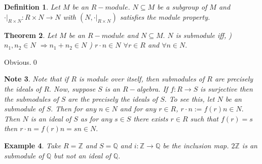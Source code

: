 \documentclass[11pt]{amsart}
\newtheorem{theorem}{Theorem}[section]
\newtheorem{definition}[theorem]{Definition}%
\newtheorem{eg}[theorem]{Example}
\newtheorem{note}[theorem]{Note}
\newcommand{\QQ}{\mathbb Q}
\newcommand{\ZZ}{\mathbb Z}
\begin{document}
\begin{definition}
Let $M$ be an $R-module.$ $N\subseteq M$ be a subgroup of $M$ and $\cdot |_{R\times N}:R\times N \rightarrow N$ with $(N,\cdot |_{R\times N})$ satisfies the module property.
\end{definition}
\begin{theorem}
Let $M$ be an $R-module$ and $N\subseteq M.$ $N$ is submodule iff,
) $n_{1},n_{2}\in N$ $\Rightarrow n_{1}+n_{2}\in N$
) $r\cdot n \in N$ $\forall r\in R$ and $\forall n\in N.$
\end{theorem}
\proof Obvious.\qed\\

\begin{note}

Note that if $R$ is module over itself, then submodules of $R$ are precisely the ideals of $R.$ Now, suppose $S$ is an $R-$algebra. If $f:R\to S$ is surjective then the submodules of $S$ are the precisely the ideals of $S.$ To see this, let $N$ be an submodule of $S.$ Then for any $n\in N$ and for any $r\in R$, $r\cdot n:=f(r)n\in N.$ Then $N$ is an ideal of $S$ as for any $s\in S$ there exists $r\in R$ such that $f(r)=s$ then $r\cdot n=f(r)n=sn\in N.$

\end{note}

\begin{eg}

Take $R={\ZZ}$ and $S={\QQ}$ and $i:{\ZZ}\to {\QQ}$ be the inclusion map. $2{\ZZ}$ is an submodule of ${\QQ}$ but not an ideal of ${\QQ}.$

\end{eg}
\end{document}
